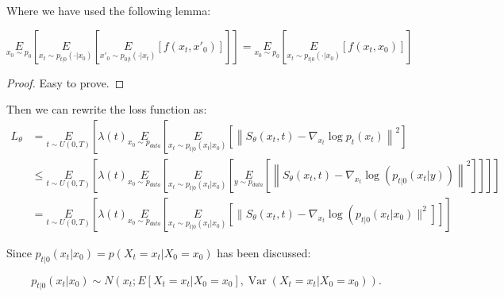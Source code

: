 Where we have used the following lemma:
\begin{lemma}
    \begin{equation}
        \underset{x_0\sim p_0}{E}\left[\underset{x_t\sim p_{t|0}(\cdot|x_0)}{E}\left[\underset{x'_0\sim p_{0|t}(\cdot|x_t)}{E}\left[f(x_t, x'_0)\right]\right]\right]=\underset{x_0\sim p_0}{E}\left[\underset{x_t\sim p_{t|0}(\cdot|x_0)}{E}\left[f(x_t, x_0)\right]\right]
    \end{equation}
\end{lemma}
\begin{proof}
    Easy to prove.
\end{proof}
Then we can rewrite the loss function as:
\begin{equation}
    \begin{aligned}
        L_{\theta}&=\underset{t\sim U(0,T)}{E}\left[\lambda(t) \underset{x_{0}\sim p_{data}}{E}\left[\underset{x_{t}\sim p_{t|0}(x_t|x_0)}{E}\left[\left\|S_{\theta}\left(x_{t}, t\right)-\nabla _{x_t}\log p_{t}\left(x_{t}\right)\right\|^{2}\right]\right.\right.\\ 
        &\leqslant \underset{t\sim U(0,T)}{E}\left[\lambda(t) \underset{x_{0}\sim p_{data}}{E}\left[\underset{x_{t}\sim p_{t|0}(x_t|x_0)}{E}\left[\underset{y\sim p_{data}}{E}\left[\left\|S_{\theta}\left(x_{t}, t\right)-\nabla_{x_{t}} \log \left(p_{t|0}(x_t | y)\right)\right\|^{2}\right]\right]\right]\right] \\
        &=\underset{t\sim U(0, T)}{E}\left[\lambda(t) \underset{x_{0}\sim p_{data}}{E}\left[\underset{x_{t}\sim p_{t|0}(x_t|x_0)}{E}\left[\| S_{\theta}\left(x_{t}, t\right)-\nabla_{x_{t}} \log \left(p_{t|0}\left(x_{t} | x_{0}\right) \|^{2}\right]\right]\right]\right.
    \end{aligned}
\end{equation}


Since  $p_{t|0}\left(x_{t} | x_{0}\right)=p\left(X_{t}=x_{t} | X_{0}=x_{0}\right)$  has been discussed:

$$p_{t | 0}\left(x_{t} | x_{0}\right) \sim N\left(x_{t} ; E\left[X_{t}=x_t | X_{0}=x_{0}\right], \operatorname{Var}\left(X_{t}=x_t | X_{0}=x_{0}\right)\right) .$$

